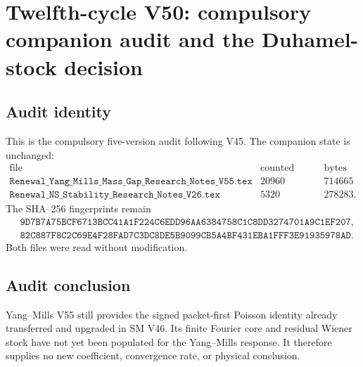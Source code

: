 \documentclass[11pt]{article}
\theoremstyle{remark}
\begin{document}

\section{Twelfth-cycle V50: compulsory companion audit and the
Duhamel-stock decision}
\label{sec:v12v50}

\subsection{Audit identity}

This is the compulsory five-version audit following V45.  The
companion state is unchanged:
\[
\begin{array}{c|r|r}
\text{file}&\text{counted lines}&\text{bytes}\\ \hline
\texttt{Renewal\_Yang\_Mills\_Mass\_Gap\_Research\_Notes\_V55.tex}
 &20960&714665\\
\texttt{Renewal\_NS\_Stability\_Research\_Notes\_V26.tex}
 &5320&278283.
\end{array}                                                   \tag{50.1}
\]
The SHA--256 fingerprints remain
\[
\begin{split}
 &\texttt{9D7B7A75BCF6713BCC41A1F224C6EDD96AA6384758C1C8DD3274701A9C1EF207},
 \\
 &\texttt{82C887F8C2C69E4F28FAD7C3DC8DE5B9099CB5A4BF431EBA1FFF3E91935978AD}.
\end{split}                                                   \tag{50.2}
\]
Both files were read without modification.

\subsection{Audit conclusion}

Yang--Mills V55 still provides the signed packet-first Poisson
identity already transferred and upgraded in SM V46.  Its finite
Fourier core and residual Wiener stock have not yet been populated
for the Yang--Mills response.  It therefore supplies no new
coefficient, convergence rate, or physical conclusion.
\end{document}
